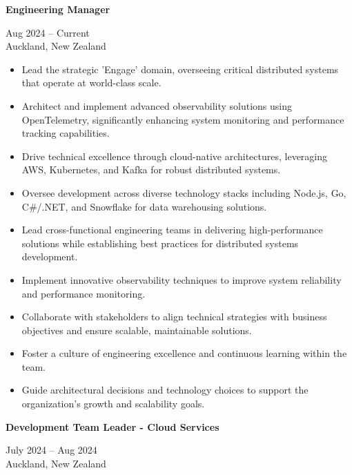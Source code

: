\documentclass[10pt,a4paper,ragged2e,withhyper]{altacv}
\renewcommand{\cvevent}[4]{%
  \textbf{#1} %
  \hfill %
  \begin{minipage}[t]{.5\linewidth}
    \raggedleft %
    \small#3 %
    \\ %
    #4 %
  \end{minipage}
  \vspace{\baselineskip} %
}
\begin{document}


\cvevent{Engineering Manager}{Invenco by GVR}{Aug 2024 -- Current}{Auckland, New Zealand}

\begin{itemize}
\item Lead the strategic 'Engage' domain, overseeing critical distributed systems that operate at world-class scale.
\item Architect and implement advanced observability solutions using OpenTelemetry, significantly enhancing system monitoring and performance tracking capabilities.
\item Drive technical excellence through cloud-native architectures, leveraging AWS, Kubernetes, and Kafka for robust distributed systems.
\item Oversee development across diverse technology stacks including Node.js, Go, C\#/.NET, and Snowflake for data warehousing solutions.
\item Lead cross-functional engineering teams in delivering high-performance solutions while establishing best practices for distributed systems development.
\item Implement innovative observability techniques to improve system reliability and performance monitoring.
\item Collaborate with stakeholders to align technical strategies with business objectives and ensure scalable, maintainable solutions.
\item Foster a culture of engineering excellence and continuous learning within the team.
\item Guide architectural decisions and technology choices to support the organization's growth and scalability goals.
\end{itemize}

\vspace{0.5cm}

\cvevent{Development Team Leader - Cloud Services}{Invenco by GVR}{July 2024 -- Aug 2024}{Auckland, New Zealand}
\end{document}
